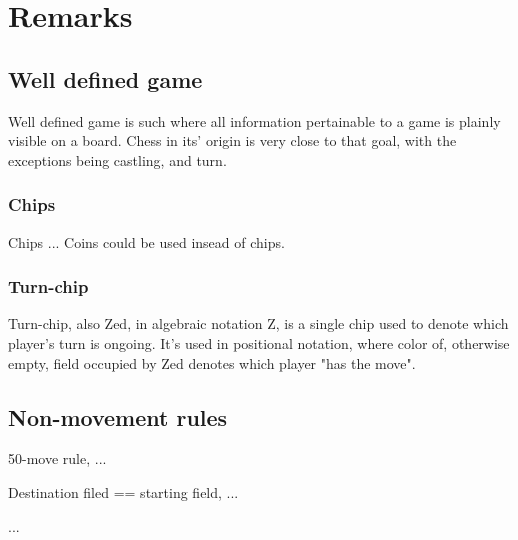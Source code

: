 
\chapter*{Remarks}
\label{ch:Remarks}

\section*{Well defined game}
\label{sec:Remarks/Well defined game}

Well defined game is such where all information pertainable to a game
is plainly visible on a board. Chess in its' origin is very close to
that goal, with the exceptions being castling, and turn.

\subsection*{Chips}
\label{sec:Remarks/Chips}
Chips ...
Coins could be used insead of chips.

\subsection*{Turn-chip}
\label{sec:Remarks/Turn-chip}
Turn-chip, also Zed, in algebraic notation Z, is a single chip used to
denote which player's turn is ongoing. It's used in positional notation,
where color of, otherwise empty, field occupied by Zed denotes which
player "has the move".

\section*{Non-movement rules}
\label{sec:Remarks/Non-movement rules}

50-move rule, ...

Destination filed == starting field, ...

...

\clearpage %
